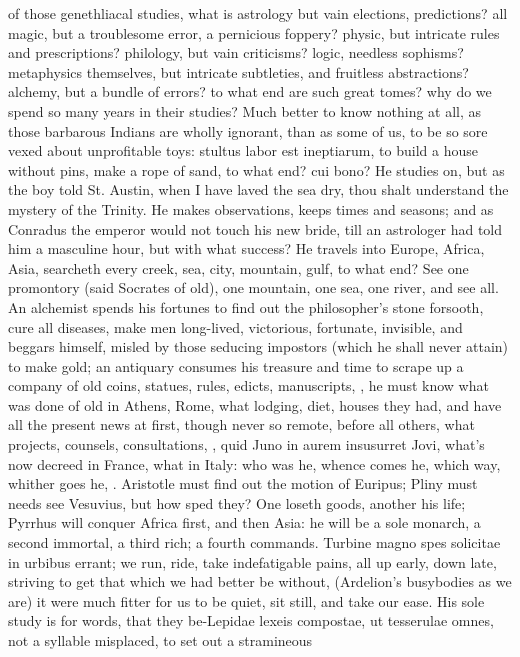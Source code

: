{of those genethliacal studies, what is astrology but vain elections,
predictions? all magic, but a troublesome error, a pernicious foppery?
physic, but intricate rules and prescriptions? philology, but vain
criticisms? logic, needless sophisms? metaphysics themselves, but
intricate subtleties, and fruitless abstractions? alchemy, but a bundle
of errors? to what end are such great tomes? why do we spend so many
years in their studies? Much better to know nothing at all, as those
barbarous Indians are wholly ignorant, than as some of us, to be so
sore vexed about unprofitable toys: stultus labor est ineptiarum, to
build a house without pins, make a rope of sand, to what end? cui bono?
He studies on, but as the boy told St. Austin, when I have laved the
sea dry, thou shalt understand the mystery of the Trinity. He makes
observations, keeps times and seasons; and as Conradus the
emperor would not touch his new bride, till an astrologer had told him
a masculine hour, but with what success? He travels into Europe,
Africa, Asia, searcheth every creek, sea, city, mountain, gulf, to what
end? See one promontory (said Socrates of old), one mountain, one sea,
one river, and see all. An alchemist spends his fortunes to find out
the philosopher's stone forsooth, cure all diseases, make men
long-lived, victorious, fortunate, invisible, and beggars himself,
misled by those seducing impostors (which he shall never attain) to
make gold; an antiquary consumes his treasure and time to scrape up a
company of old coins, statues, rules, edicts, manuscripts, \etc{}, he must
know what was done of old in Athens, Rome, what lodging, diet, houses
they had, and have all the present news at first, though never so
remote, before all others, what projects, counsels, consultations, \etc{},
quid Juno in aurem insusurret Jovi, what's now decreed in France, what
in Italy: who was he, whence comes he, which way, whither goes he, \etc{}.
Aristotle must find out the motion of Euripus; Pliny must needs see
Vesuvius, but how sped they? One loseth goods, another his life;
Pyrrhus will conquer Africa first, and then Asia: he will be a sole
monarch, a second immortal, a third rich; a fourth commands. 
Turbine magno spes solicitae in urbibus errant; we run, ride, take
indefatigable pains, all up early, down late, striving to get that
which we had better be without, (Ardelion's busybodies as we are) it
were much fitter for us to be quiet, sit still, and take our ease. His
sole study is for words, that they be-Lepidae lexeis compostae, ut
tesserulae omnes, not a syllable misplaced, to set out a stramineous
}
